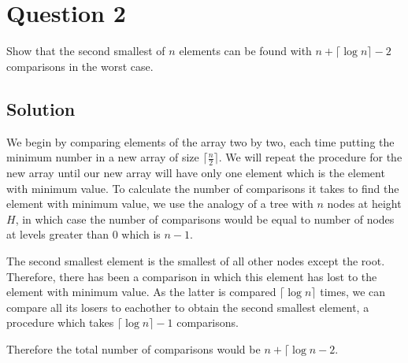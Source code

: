 
\section*{Question 2}

Show that the second smallest of $n$ elements can be found with $n + \lceil \log n \rceil - 2$ comparisons in the worst case.

\subsection*{Solution}

We begin by comparing elements of the array two by two, each time putting the minimum number in a new array of size $\lceil \frac{n}{2} \rceil$.
We will repeat the procedure for the new array until our new array will have only one element which is the element with minimum value.
To calculate the number of comparisons it takes to find the element with minimum value, we use the analogy of a tree with $n$ nodes at height $H$, in which case the number of comparisons would be equal to number of nodes at levels greater than $0$ which is $n - 1$.

The second smallest element is the smallest of all other nodes except the root.
Therefore, there has been a comparison in which this element has lost to the element with minimum value.
As the latter is compared $\lceil \log n \rceil$ times, we can compare all its losers to eachother to obtain the second smallest element, a procedure which takes $\lceil \log n \rceil - 1$ comparisons.

Therefore the total number of comparisons would be $n + \lceil \log n - 2$.

